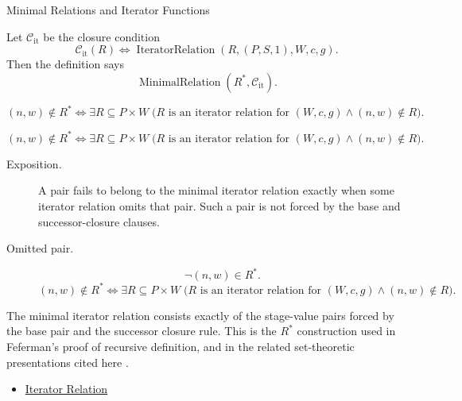 \begin{topicbox}{Minimal Relations and Iterator Functions}
\begin{remark*}
Let $\mathcal C_{\mathrm{it}}$ be the closure condition
\[
\mathcal C_{\mathrm{it}}(R)
\Longleftrightarrow
\operatorname{IteratorRelation}(R,(P,S,1),W,c,g).
\]
Then the definition says
\[
\operatorname{MinimalRelation}(R^*,\mathcal C_{\mathrm{it}}).
\]
\end{remark*}

\begin{remark*}
\[
(n,w)\notin R^*
\Longleftrightarrow
\exists R\subseteq P\times W\;
\bigl(R \text{ is an iterator relation for } (W,c,g)\land (n,w)\notin R\bigr).
\]
\end{remark*}

\begin{remark*}
\[
(n,w)\notin R^*
\Longleftrightarrow
\exists R\subseteq P\times W\;
\bigl(R \text{ is an iterator relation for } (W,c,g)\land (n,w)\notin R\bigr).
\]
\end{remark*}

\begin{remark*}
\begin{description}
  \item[Exposition.]
  A pair fails to belong to the minimal iterator relation exactly when some
  iterator relation omits that pair. Such a pair is not forced by the base and
  successor-closure clauses.
  \item[Omitted pair.]
  \[
  \neg (n,w)\in R^*.
  \]
  \[
  (n,w)\notin R^*
  \Longleftrightarrow
  \exists R\subseteq P\times W\;
  \bigl(R \text{ is an iterator relation for } (W,c,g)\land (n,w)\notin R\bigr).
  \]
\end{description}
\end{remark*}

\begin{remark*}[Interpretation]
The minimal iterator relation consists exactly of the stage-value pairs forced
by the base pair and the successor closure rule. This is the $R^*$ construction
used in Feferman's proof of recursive definition, and in the related
set-theoretic presentations cited here
\citep{FefermanNumberSystems1964,hrbacek_jech1999,chi_recursion_wustl}.
\end{remark*}

\begin{dependencies}
\begin{itemize}
  \item \hyperref[def:iterator-relation]{Iterator Relation}
\end{itemize}
\end{dependencies}


\end{topicbox}
